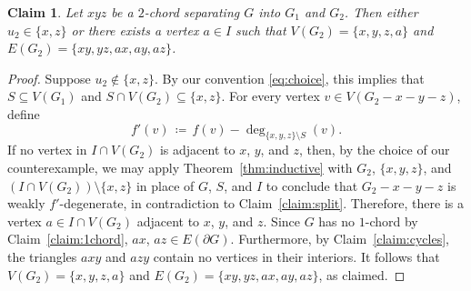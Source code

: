 \documentclass[11pt]{article}
\theoremstyle{slantthm}
\newtheorem{claim}{Claim}%
\numberwithin{equation}{section}
\theoremstyle{definition}
\renewcommand{\leq}{\leqslant}
\newcommand{\defeq}{\coloneqq}
\numberwithin{equation}{section}
\newcommand{\0}{\varnothing}
\newcommand{\set}[1]{\{#1\}}
\newcommand{\bdry}[1]{{\partial #1}}
\begin{document}
    \begin{claim}\label{claim:2chord}
    Let $xyz$ be a $2$-chord separating $G$ into $G_1$ and $G_2$. Then either $u_2 \in \set{x,z}$ or %
        there exists a vertex $a \in I$ such that $V(G_2) = \set{x,y,z,a}$ and $E(G_2) = \set{xy, yz, ax, ay, az}$. 
    \end{claim}
    \begin{proof}
        Suppose $u_2 \notin \set{x,z}$. By our convention \eqref{eq:choice}, this implies that $S \subseteq V(G_1)$ and $S \cap V(G_2) \subseteq \set{x,z}$. For every vertex $v \in V(G_2 - x - y - z)$, define
        \[
            f'(v) \,\defeq\, f(v) - \deg_{\set{x,y,z} \setminus S} (v). %
        \] %
        If no vertex in $I \cap V(G_2)$ is adjacent to $x$, $y$, and $z$, then, by the choice of our counterexample, we may apply Theorem~\ref{thm:inductive} with $G_2$, $\set{x,y,z}$, and $(I \cap V(G_2)) \setminus \set{x,z}$ in place of $G$, $S$, and $I$ to conclude that $G_2 - x - y - z$ is weakly $f'$-degenerate, in contradiction to Claim~\ref{claim:split}. Therefore, there is a vertex $a \in I \cap V(G_2)$ adjacent to $x$, $y$, and $z$. Since $G$ has no $1$-chord by Claim~\ref{claim:1chord}, $ax$, $az \in E(\bdry{G})$. Furthermore, by Claim~\ref{claim:cycles}, the triangles $axy$ and $azy$ contain no vertices in their interiors. It follows that $V(G_2) = \set{x,y,z,a}$ and $E(G_2) = \set{xy, yz, ax, ay, az}$, as claimed. %
    \end{proof}
\end{document}
